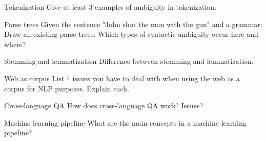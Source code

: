 \documentclass{article}
\author{Leopold Lemmermann}
\begin{document}
\createtitle


\setcounter{section}{2022}
\begin{exercise}{Tokenization}
  Give at least 3 examples of ambiguity in tokenization.

  \begin{solution}
  \end{solution}
\end{exercise}

\begin{exercise}{Parse trees}
  Given the sentence "John shot the man with the gun" and a grammar: Draw all existing parse trees. Which types of syntactic ambiguity occur here and where?

  \begin{solution}
  \end{solution}
\end{exercise}

\begin{exercise}{Stemming and lemmatization}
  Difference between stemming and lemmatization.

  \begin{solution}
  \end{solution}
\end{exercise}

\begin{exercise}{Web as corpus}
  List 4 issues you have to deal with when using the web as a corpus for NLP purposes. Explain each.

  \begin{solution}
  \end{solution}
\end{exercise}

\begin{exercise}{Cross-language QA}
  How does cross-language QA work? Issues?

  \begin{solution}
  \end{solution}
\end{exercise}

\begin{exercise}{Machine learning pipeline}
  What are the main concepts in a machine learning pipeline?

  \begin{solution}
  \end{solution}
\end{exercise}
\end{document}
